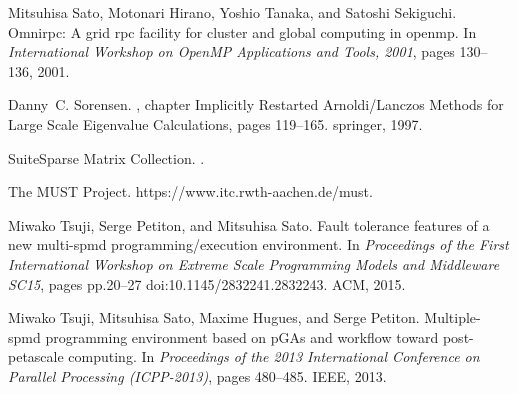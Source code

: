 \documentclass[graybox]{svmult}
\begin{document}
\begin{thebibliography}{10}
Mitsuhisa Sato, Motonari Hirano, Yoshio Tanaka, and Satoshi Sekiguchi.
\newblock Omnirpc: A grid rpc facility for cluster and global computing in
  openmp.
\newblock In {\em International Workshop on OpenMP Applications and Tools,
  2001}, pages 130--136, 2001.

Danny~C. Sorensen.
, chapter Implicitly Restarted Arnoldi/Lanczos
  Methods for Large Scale Eigenvalue Calculations, pages 119--165.
\newblock springer, 1997.

{SuiteSparse Matrix Collection}.
.

{The MUST Project}.
\newblock https://www.itc.rwth-aachen.de/must.

Miwako Tsuji, Serge Petiton, and Mitsuhisa Sato.
\newblock Fault tolerance features of a new multi-spmd programming/execution
  environment.
\newblock In {\em Proceedings of the First International Workshop on Extreme
  Scale Programming Models and Middleware SC15}, pages pp.20--27
  doi:10.1145/2832241.2832243. ACM, 2015.

Miwako Tsuji, Mitsuhisa Sato, Maxime Hugues, and Serge Petiton.
\newblock Multiple-spmd programming environment based on p{GA}s and workflow
  toward post-petascale computing.
\newblock In {\em Proceedings of the 2013 International Conference on Parallel
  Processing (ICPP-2013)}, pages 480--485. IEEE, 2013.

\end{thebibliography}
\end{document}
